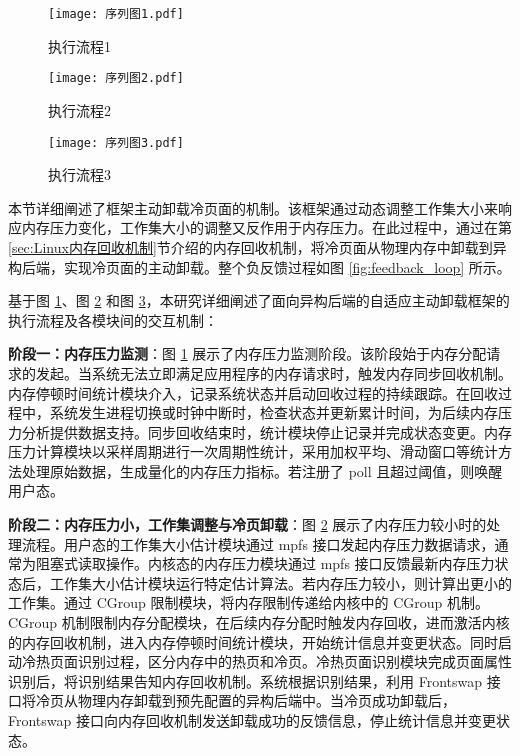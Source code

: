 \begin{figure}[htb]
\centering
\texttt{[image: 序列图1.pdf]}
\caption{执行流程1}
\label{fig:kernel_sequence_diagram_1}
\end{figure}

\begin{figure}[htb]
\centering
\texttt{[image: 序列图2.pdf]}
\caption{执行流程2}
\label{fig:kernel_sequence_diagram_2}
\end{figure}

\begin{figure}[htb]
\centering
\texttt{[image: 序列图3.pdf]}
\caption{执行流程3}
\label{fig:kernel_sequence_diagram_3}
\end{figure}

本节详细阐述了框架主动卸载冷页面的机制。该框架通过动态调整工作集大小来响应内存压力变化，工作集大小的调整又反作用于内存压力。在此过程中，通过在第\ref{sec:Linux内存回收机制}节介绍的内存回收机制，将冷页面从物理内存中卸载到异构后端，实现冷页面的主动卸载。整个负反馈过程如图 \ref{fig:feedback_loop} 所示。

基于图 \ref{fig:kernel_sequence_diagram_1}、图 \ref{fig:kernel_sequence_diagram_2} 和图 \ref{fig:kernel_sequence_diagram_3}，本研究详细阐述了面向异构后端的自适应主动卸载框架的执行流程及各模块间的交互机制：

\textbf{阶段一：内存压力监测}：图 \ref{fig:kernel_sequence_diagram_1} 展示了内存压力监测阶段。该阶段始于内存分配请求的发起。当系统无法立即满足应用程序的内存请求时，触发内存同步回收机制。内存停顿时间统计模块介入，记录系统状态并启动回收过程的持续跟踪。在回收过程中，系统发生进程切换或时钟中断时，检查状态并更新累计时间，为后续内存压力分析提供数据支持。同步回收结束时，统计模块停止记录并完成状态变更。内存压力计算模块以采样周期进行一次周期性统计，采用加权平均、滑动窗口等统计方法处理原始数据，生成量化的内存压力指标。若注册了 poll 且超过阈值，则唤醒用户态。

\textbf{阶段二：内存压力小，工作集调整与冷页卸载}：图 \ref{fig:kernel_sequence_diagram_2} 展示了内存压力较小时的处理流程。用户态的工作集大小估计模块通过 mpfs 接口发起内存压力数据请求，通常为阻塞式读取操作。内核态的内存压力模块通过 mpfs 接口反馈最新内存压力状态后，工作集大小估计模块运行特定估计算法。若内存压力较小，则计算出更小的工作集。通过  CGroup  限制模块，将内存限制传递给内核中的  CGroup  机制。 CGroup  机制限制内存分配模块，在后续内存分配时触发内存回收，进而激活内核的内存回收机制，进入内存停顿时间统计模块，开始统计信息并变更状态。同时启动冷热页面识别过程，区分内存中的热页和冷页。冷热页面识别模块完成页面属性识别后，将识别结果告知内存回收机制。系统根据识别结果，利用 Frontswap 接口将冷页从物理内存卸载到预先配置的异构后端中。当冷页成功卸载后，Frontswap 接口向内存回收机制发送卸载成功的反馈信息，停止统计信息并变更状态。

